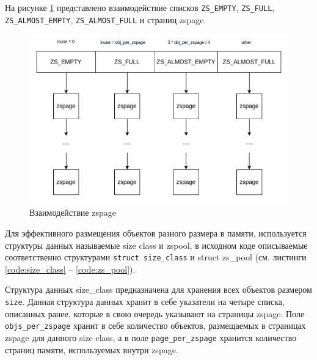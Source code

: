 На рисунке \ref{fig:fullness_group} представлено взаимодействие списков \texttt{ZS\_EMPTY}, \texttt{ZS\_FULL}, \texttt{ZS\_ALMOST\_EMPTY}, \texttt{ZS\_ALMOST\_FULL} и страниц zspage. 

\begin{figure}[h]
	\centering
	\includegraphics[width=\textwidth]{img/fullness_group.png}
	\caption{Взаимодействие zspage}
	\label{fig:fullness_group}
\end{figure}

Для эффективного размещения объектов разного размера в памяти, используется структуры данных называемые size class и zspool, в исходном коде описываемые соответственно структурами \texttt{struct size\_class} и {struct zs\_pool} (см. листинги \ref{code:size_class} -- \ref{code:zs_pool}).

\pagebreak


Структура данных size\_class предназначена для хранения всех объектов размером \texttt{size}. Данная структура данных хранит в себе указатели на  четыре списка, описанных ранее, которые в свою очередь указывают на страницы zspage. Поле \texttt{objs\_per\_zspage} хранит в себе количество объектов, размещаемых в страницах zspage для данного size class, а в поле \texttt{page\_per\_zspage} хранится количество страниц памяти, используемых внутри zspage.

